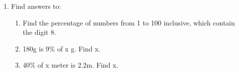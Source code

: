 \documentclass[fleqn, a4paper, 11pt]{article}
\begin{document}
\begin{enumerate}
	\item Find answers to:
	      \begin{enumerate}[itemsep=1.5in]
		      \item Find the percentage of numbers from 1 to 100 inclusive, which contain the digit 8.
		      \item 180g is 9\% of x g. Find x.
		      \item 40\% of x meter is 2.2m. Find x.

	      \end{enumerate}
	      \vspace{1in}


\end{enumerate}
\end{document}

